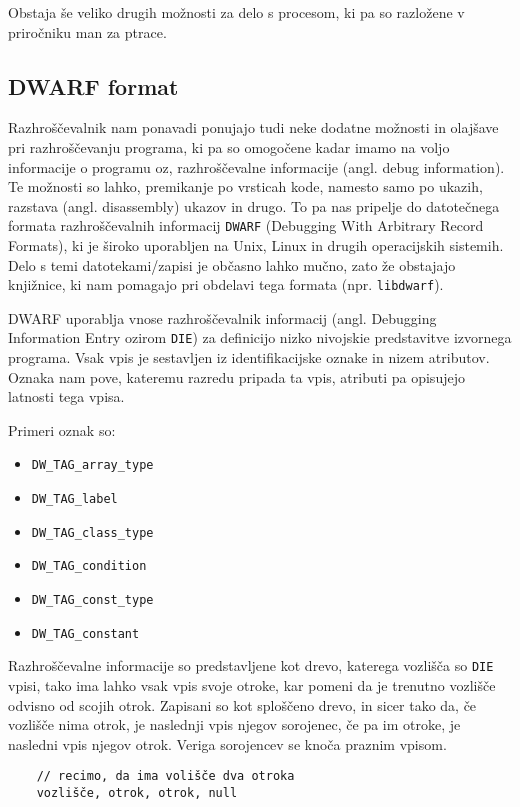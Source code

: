\documentclass[a4paper,notitlepage]{article}
\newcommand{\code}[1]{\texttt{#1}}
\begin{document}
Obstaja še veliko drugih možnosti za delo s procesom, ki pa so razložene v priročniku man za ptrace\cite{ptrace-man-page}.

\subsection{DWARF format}

Razhroščevalnik nam ponavadi ponujajo tudi neke dodatne možnosti in olajšave pri razhroščevanju programa, ki pa so omogočene kadar imamo na voljo informacije o programu oz, razhroščevalne informacije (angl. debug information).
Te možnosti so lahko, premikanje po vrsticah kode, namesto samo po ukazih, razstava (angl. disassembly) ukazov in drugo.
To pa nas pripelje do datotečnega formata razhroščevalnih informacij \code{DWARF} (Debugging With Arbitrary Record Formats)\cite{dwarf-web-page}, ki je široko uporabljen na Unix, Linux in drugih operacijskih sistemih.
Delo s temi datotekami/zapisi je občasno lahko mučno, zato že obstajajo knjižnice, ki nam pomagajo pri obdelavi tega formata (npr. \code{libdwarf}\cite{libdwarf}).

DWARF uporablja vnose razhroščevalnik informacij (angl. Debugging Information Entry ozirom \code{DIE}) za definicijo nizko nivojskie predstavitve izvornega programa.
Vsak vpis je sestavljen iz identifikacijske oznake in nizem atributov. Oznaka nam pove, kateremu razredu pripada ta vpis, atributi pa opisujejo latnosti tega vpisa.

Primeri oznak so:
\begin{itemize}
    \item \code{DW_TAG_array_type}
    \item \code{DW_TAG_label}
    \item \code{DW_TAG_class_type}
    \item \code{DW_TAG_condition}
    \item \code{DW_TAG_const_type}
    \item \code{DW_TAG_constant}
\end{itemize}

Razhroščevalne informacije so predstavljene kot drevo, katerega vozlišča so \code{DIE} vpisi, tako ima lahko vsak vpis svoje otroke, kar pomeni da je trenutno vozlišče odvisno od scojih otrok.
Zapisani so kot sploščeno drevo, in sicer tako da, če vozlišče nima otrok, je naslednji vpis njegov sorojenec, če pa im otroke, je nasledni vpis njegov otrok. Veriga sorojencev se knoča praznim vpisom.

\begin{verbatim}
    // recimo, da ima volišče dva otroka
    vozlišče, otrok, otrok, null
\end{verbatim}
\end{document}
